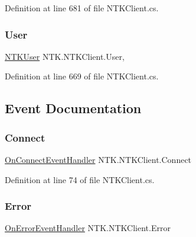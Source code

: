 Definition at line 681 of file N\+T\+K\+Client.\+cs.

\mbox{\label{class_n_t_k_1_1_n_t_k_client_a5483fdd0b2d7ec565734be2a52a4d453}} 
\subsubsection{\texorpdfstring{User}{User}}
{\footnotesize\ttfamily \mbox{\hyperlink{class_n_t_k_1_1_n_t_k_user}{N\+T\+K\+User}} N\+T\+K.\+N\+T\+K\+Client.\+User\hspace{0.3cm}{\ttfamily [get]}, {\ttfamily [set]}}







Definition at line 669 of file N\+T\+K\+Client.\+cs.



\subsection{Event Documentation}
\mbox{\label{class_n_t_k_1_1_n_t_k_client_a0c60a69d1fa1e8cca122b89b7a44bf7a}} 
\subsubsection{\texorpdfstring{Connect}{Connect}}
{\footnotesize\ttfamily \mbox{\hyperlink{namespace_n_t_k_a8743f7b779ee57a52d3757cd46ea0060}{On\+Connect\+Event\+Handler}} N\+T\+K.\+N\+T\+K\+Client.\+Connect}







Definition at line 74 of file N\+T\+K\+Client.\+cs.

\mbox{\label{class_n_t_k_1_1_n_t_k_client_abddf03638d993f877c31c1deeb87430b}} 
\subsubsection{\texorpdfstring{Error}{Error}}
{\footnotesize\ttfamily \mbox{\hyperlink{namespace_n_t_k_a41f1f90439f13a48e64026ed730a1df8}{On\+Error\+Event\+Handler}} N\+T\+K.\+N\+T\+K\+Client.\+Error}








